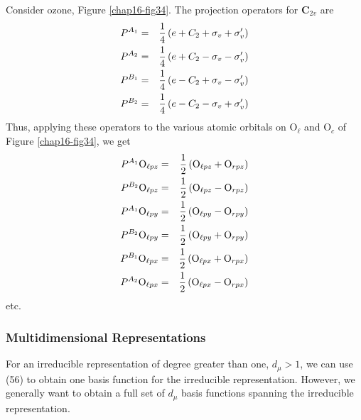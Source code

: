 Consider ozone, Figure \ref{chap16-fig34}.  The projection operators
for {\bf C}$_{2v}$ are
\begin{eqnarray}
P^{A_1} &=& {1 \over 4} \left( e + C_2 + \sigma_v + \sigma^{\prime}_v 
\right)\cr
P^{A_2} &=& {1 \over 4} \left( e + C_2 - \sigma_v - \sigma^{\prime}_v 
\right)\cr
P^{B_1} &=& {1 \over 4} \left( e - C_2 + \sigma_v - \sigma^{\prime}_v 
\right)\cr
P^{B_2} &=& {1 \over 4} \left( e - C_2 - \sigma_v + \sigma^{\prime}_v 
\right)
\end{eqnarray}
Thus, applying these operators to the various atomic orbitals on
O$_{\ell}$ and O$_c$ of Figure \ref{chap16-fig34}, we get
\begin{eqnarray}
P^{A_1}{\rm O}_{\ell pz} &=& {1 \over 2} \left( {\rm O}_{\ell pz} + 
{\rm O}_{rpz} \right)\cr
P^{B_2}{\rm O}_{\ell pz} &=& {1 \over 2} \left( {\rm O}_{\ell pz} - 
{\rm O}_{rpz} \right)\cr
P^{A_1}{\rm O}_{\ell py} &=& {1 \over 2} \left( {\rm O}_{\ell py} -
{\rm O}_{rpy} \right)\cr
P^{B_2}{\rm O}_{\ell py} &=& {1 \over 2} \left( {\rm O}_{\ell py} + 
{\rm O}_{rpy} \right)\cr
P^{B_1}{\rm O}_{\ell px} &=& {1 \over 2} \left( {\rm O}_{\ell px} + 
{\rm O}_{rpx} \right)\cr
P^{A_2}{\rm O}_{\ell px} &=& {1 \over 2} \left( {\rm O}_{\ell px} - 
{\rm O}_{rpx} \right)
\end{eqnarray}
etc.

\subsubsection{Multidimensional Representations}

For an irreducible representation of degree greater than one, 
$d_{\mu} > 1$, we can use (56) to obtain one basis function for the 
irreducible representation.  However, we generally want to obtain a 
full set of $d_{\mu}$ basis functions spanning the irreducible representation.

